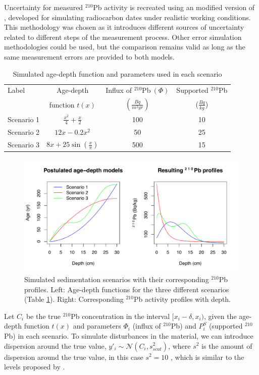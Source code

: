 \documentclass [10pt] {article}
\begin{document}
Uncertainty for measured $^{210}$Pb  activity is recreated using an modified version of \citet{Blaauw2018}, developed for simulating radiocarbon dates under realistic working conditions.
This methodology was chosen as it introduces different sources of uncertainty related to different steps of the measurement process.
Other error simulation methodologies could be used, but the comparison remains valid as long as the same measurement errors are provided to both models.

\begin{table}[!h]
	\centering
	\begin{tabular}{l|ccc}
	     Label   & 	Age-depth			&	Influx of $^{210}$Pb$~(\Phi)$	& Supported $^{210}$Pb  \\
			&	function $t(x)$		&	$(\frac{Bq}{m^2yr})$	& ($\frac{Bq}{kg}$) 	\\ \hline
Scenario 1 	&	$\frac{x^2}{4} + \frac{x}{2}$	&	100	& 10	\\
Scenario 2 	&	$12x -0.2x^2$			&	50	& 25	\\
Scenario 3 	&	$8x+25\sin(\frac{x}{\pi})$	&	500 	& 15		
	\end{tabular}
	\label{tab:sim_param}
	\caption{Simulated age-depth function and parameters used in each scenario}
\end{table}

\begin{figure}[!h]
 \centering
  \includegraphics[width=.95\linewidth]{chronology.pdf}
	\caption{Simulated sedimentation scenarios with their corresponding $^{210}$Pb profiles. Left: Age-depth functions for the three different scenarios (Table \ref{tab:sim_param}). Right: Corresponding $^{210}$Pb activity profiles with depth.}
  \label{fig:true_210}
\end{figure}

	Let $C_{i}$ be the true $^{210}$Pb concentration in the interval $[ x_i-\delta, x_i)$, given the age-depth function $t(x)$ and parameters $\Phi_i$ (influx of $^{210}$Pb) and $P_i^S$ (supported $^{210}$Pb) in each scenario. 
To simulate disturbances in the material, we can introduce dispersion around the true value, $y'_i \sim \mathcal{N}\left(C_i,s^2_{scat} \right)$, where $s^2$ is the amount of dispersion around the true value, in this case $s^2=10$ , which is similar to the levels proposed by \citet{Blaauw2018}. 
\end{document}

